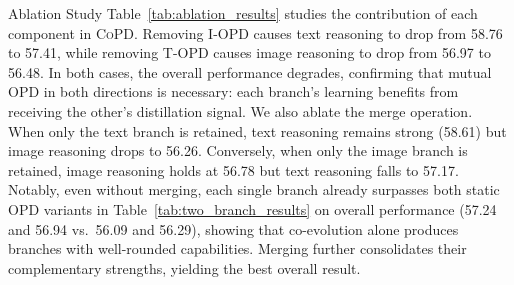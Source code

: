 \documentclass{llmxive}
\providecommand{\method}{\textsc{CoPD}\xspace}
\begin{document}
{Ablation Study} Table~\ref{tab:ablation_results} studies the contribution of each component in \method. Removing I-OPD causes text reasoning to drop from 58.76 to 57.41, while removing T-OPD causes image reasoning to drop from 56.97 to 56.48. In both cases, the overall performance degrades, confirming that mutual OPD in both directions is necessary: each branch's learning benefits from receiving the other's distillation signal. We also ablate the merge operation. When only the text branch is retained, text reasoning remains strong (58.61) but image reasoning drops to 56.26. Conversely, when only the image branch is retained, image reasoning holds at 56.78 but text reasoning falls to 57.17. Notably, even without merging, each single branch already surpasses both static OPD variants in Table~\ref{tab:two_branch_results} on overall performance (57.24 and 56.94 vs.\ 56.09 and 56.29), showing that co-evolution alone produces branches with well-rounded capabilities. Merging further consolidates their complementary strengths, yielding the best overall result.
\end{document}
